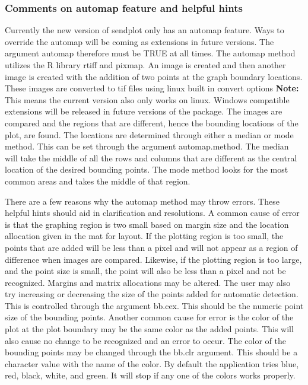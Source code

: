 \documentclass[]{article}
\begin{document}
\subsubsection{Comments on automap feature and  helpful hints}

\indent Currently the new version of sendplot only has an automap feature. Ways to override the automap will be coming as extensions in future versions. The argument automap therefore must be TRUE at all times. The automap method utilizes the R library rtiff and pixmap. An image is created and then another image is created with the addition of two points at the graph boundary locations. These images are converted to tif files using linux built in convert options {\bf{Note:}} This means the current version also only works on linux. Windows compatible extensions will be released in future versions of the package. The images are compared and the regions that are different, hence the bounding locations of the plot, are found. The locations are determined through either a median or mode method. This can be set through the argument automap.method. The median will take the middle of all the rows and columns that are different as the central location of the desired bounding points. The mode method looks for the most common areas and takes the middle of that region. \newline

\indent There are a few reasons why the automap method may throw errors. These helpful hints should aid in clarification and resolutions. A common cause of error is that the graphing region is two small based on margin size and the location allocation given in the mat for layout. If the plotting region is too small, the points that are added will be less than a pixel and will not appear as a region of difference when images are compared. Likewise, if the plotting region is too large, and the point size is small, the point will also be less than a pixel and not be recognized.  Margins and matrix allocations may be altered. The user may also try increasing or decreasing the size of the points added for automatic detection. This is controlled through the argument bb.cex. This should be the numeric point size of the bounding points. Another common cause for error is the color of the plot at the plot boundary may be the same color as the added points. This will also cause no change to be recognized and an error to occur. The color of the bounding points may be changed through the bb.clr argument. This should be a character value with the name of the color. By default the application tries blue, red, black, white, and green. It will stop if any one of the colors works properly. 
\end{document}
